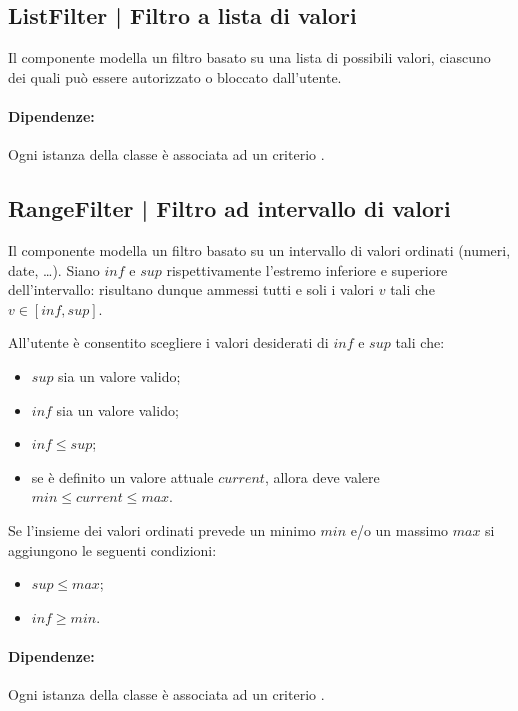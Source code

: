 \documentclass[10pt,a4paper,headinclude,footinclude,hidelinks]{scrreprt} %
\begin{document}
	\subsection[ListFilter]{ListFilter | Filtro a lista di valori}
	\label{sec:stage:design:sistema:model.filter:list-filter}
	Il componente modella un filtro basato su una lista di possibili valori, ciascuno dei quali può essere autorizzato o bloccato dall'utente.

	\paragraph{Dipendenze:} Ogni istanza della classe \textit{} è associata ad un criterio \textit{}.

	\subsection[RangeFilter]{RangeFilter | Filtro ad intervallo di valori}
	\label{sec:stage:design:sistema:model.filter:range-filter}
	Il componente modella un filtro basato su un intervallo di valori ordinati (numeri, date, \ldots). Siano $inf$ e $sup$ rispettivamente l'estremo inferiore e superiore dell'intervallo: risultano dunque ammessi tutti e soli i valori $v$ tali che $v \in \left[inf,sup\right]$.

	All'utente è consentito scegliere i valori desiderati di $inf$ e $sup$ tali che:
	\begin{itemize}
	\item $sup$ sia un valore valido;
	\item $inf$ sia un valore valido;
	\item $inf \leq sup$;
	\item se è definito un valore attuale $current$, allora deve valere $min \leq current \leq max$.
	\end{itemize}

	Se l'insieme dei valori ordinati prevede un minimo $min$ e/o un massimo $max$ si aggiungono le seguenti condizioni:
	\begin{itemize}
	\item $sup \leq max$;
	\item $inf \geq min$.
	\end{itemize}

	\paragraph{Dipendenze:} Ogni istanza della classe \textit{} è associata ad un criterio \textit{}.
\end{document}

